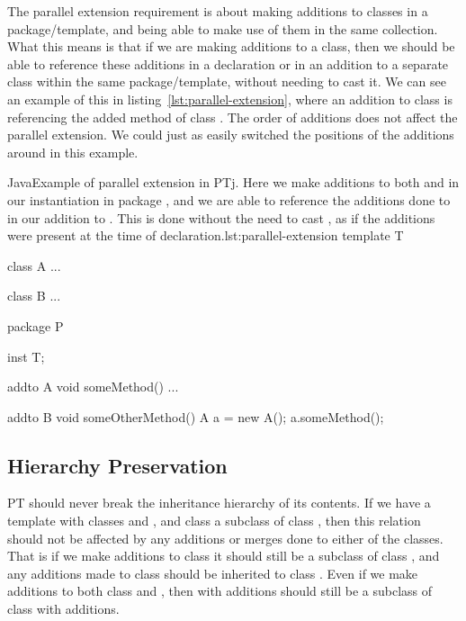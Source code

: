 The parallel extension requirement is about making additions to classes in a package/template, and being able to make use of them in the same collection.
What this means is that if we are making additions to a class, then we should be able to reference these additions in a declaration or in an addition to a separate class within the same package/template, without needing to cast it.
We can see an example of this in listing~\vref{lst:parallel-extension}, where an addition to class  is referencing the added method of class .
The order of additions does not affect the parallel extension.
We could just as easily switched the positions of the additions around in this example.

\begin{code}{Java}{Example of parallel extension in PTj. Here we make additions to both  and  in our instantiation in package , and we are able to reference the additions done to  in our addition to . This is done without the need to cast , as if the additions were present at the time of declaration.}{lst:parallel-extension}
    template T {
        class A {
            ...
        }

        class B {
            ...
        }
    }

    package P {
        inst T;

        addto A {
            void someMethod() {
                ...
            }
        }

        addto B {
            void someOtherMethod() {
                A a = new A();
                a.someMethod();
            }
        }
    }
\end{code}

\subsection{Hierarchy Preservation}\label{subsec:hierachy-preservation}
%
PT should never break the inheritance hierarchy of its contents.
If we have a template with classes  and , and class  a subclass of class , then this relation should not be affected by any additions or merges done to either of the classes.
That is if we make additions to class  it should still be a subclass of class , and any additions made to class  should be inherited to class .
Even if we make additions to both class  and , then  with additions should still be a subclass of class  with additions.


